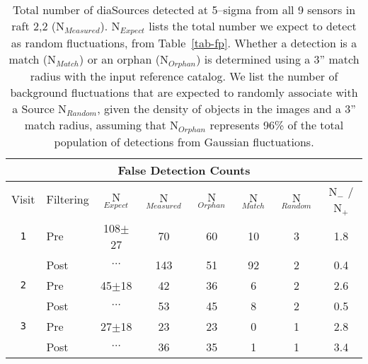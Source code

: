 \documentclass[iop]{emulateapj}
\begin{document}
\begin{table*}[t]
\centering
\begin{tabular}{clc|ccccc}
\hline
\multicolumn{8}{|c|}{False Detection Counts} \\
\hline
Visit   & Filtering & N$_{Expect}$ & N$_{Measured}$ &  N$_{Orphan}$ & N$_{Match}$ & N$_{Random}$ & N$_{-}$ / N$_{+}$\\
\hline
{\tt 1} & Pre      & 108$\pm$27   & 70      &60         & 10 & 3  & 1.8 \\ 
        & Post     & $\cdots$     & 143     &51         & 92 & 2  & 0.4 \\
{\tt 2} & Pre      & 45$\pm$18    & 42      &36         & 6  & 2  & 2.6 \\
        & Post     & $\cdots$     & 53      &45         & 8  & 2  & 0.5 \\
{\tt 3} & Pre      & 27$\pm$18    & 23      &23         & 0  & 1  & 2.8 \\
        & Post     & $\cdots$     & 36      &35         & 1  & 1  & 3.4 \\
\end{tabular}
\caption{{\rm Total number of diaSources detected at 5--sigma from all 9 sensors in raft 2,2 (N$_{Measured}$).
  N$_{Expect}$ lists the total number we expect to detect as random fluctuations, from Table~\ref{tab-fp}.
  Whether a detection is a match (N$_{Match}$) or an orphan (N$_{Orphan}$) is determined using a 3'' match radius with the input reference catalog.
  We list the number of background fluctuations that are expected to randomly associate with a Source N$_{Random}$, given the density of objects in the images and a 3'' match radius, assuming that N$_{Orphan}$ represents 96\% of the total population of detections from Gaussian fluctuations.
  \label{tab-bestfp10}}}
\end{table*}
\end{document}
